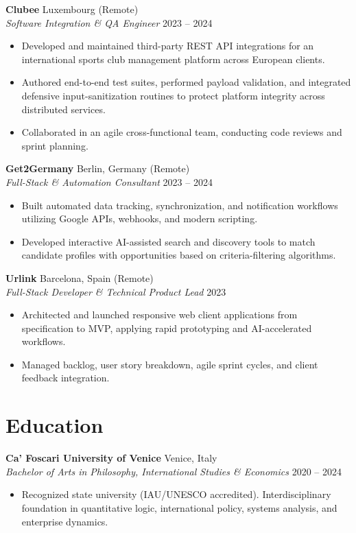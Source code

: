 \documentclass[10pt,a4paper]{article}
\begin{document}
\vspace{2pt}
\textbf{Clubee} \hfill Luxembourg (Remote)\\
\textit{Software Integration \& QA Engineer} \hfill 2023 -- 2024
\begin{itemize}
    \item Developed and maintained third-party REST API integrations for an international sports club management platform across European clients.
    \item Authored end-to-end test suites, performed payload validation, and integrated defensive input-sanitization routines to protect platform integrity across distributed services.
    \item Collaborated in an agile cross-functional team, conducting code reviews and sprint planning.
\end{itemize}

\vspace{2pt}
\textbf{Get2Germany} \hfill Berlin, Germany (Remote)\\
\textit{Full-Stack \& Automation Consultant} \hfill 2023 -- 2024
\begin{itemize}
    \item Built automated data tracking, synchronization, and notification workflows utilizing Google APIs, webhooks, and modern scripting.
    \item Developed interactive AI-assisted search and discovery tools to match candidate profiles with opportunities based on criteria-filtering algorithms.
\end{itemize}

\vspace{2pt}
\textbf{Urlink} \hfill Barcelona, Spain (Remote)\\
\textit{Full-Stack Developer \& Technical Product Lead} \hfill 2023
\begin{itemize}
    \item Architected and launched responsive web client applications from specification to MVP, applying rapid prototyping and AI-accelerated workflows.
    \item Managed backlog, user story breakdown, agile sprint cycles, and client feedback integration.
\end{itemize}

\section{Education}
\textbf{Ca' Foscari University of Venice} \hfill Venice, Italy\\
\textit{Bachelor of Arts in Philosophy, International Studies \& Economics} \hfill 2020 -- 2024
\begin{itemize}
    \item Recognized state university (IAU/UNESCO accredited). Interdisciplinary foundation in quantitative logic, international policy, systems analysis, and enterprise dynamics.
\end{itemize}
\end{document}
